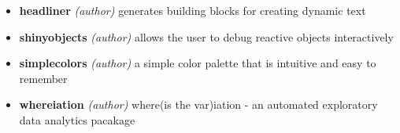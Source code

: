 \documentclass[11pt, a4paper]{awesome-cv}
\providecommand{\tightlist}{%
	\setlength{\itemsep}{0pt}\setlength{\parskip}{0pt}}
\begin{document}
\begin{itemize}
\tightlist
\item
  \textbf{headliner} \emph{(author)} generates building blocks for
  creating dynamic text
  \href{https://rjake.github.io/headliner/}{\tiny\color{lightgray}\faLink}
\item
  \textbf{shinyobjects} \emph{(author)} allows the user to debug
  reactive objects interactively
  \href{https://rjake.github.io/shinyobjects/index.html}{\tiny\color{lightgray}\faLink}
\item
  \textbf{simplecolors} \emph{(author)} a simple color palette that is
  intuitive and easy to remember
  \href{https://rjake.github.io/simplecolors/articles/intro.html}{\tiny\color{lightgray}\faLink}
\item
  \textbf{whereiation} \emph{(author)} where(is the var)iation - an
  automated exploratory data analytics pacakage
  \href{https://rjake.github.io/whereiation/}{\tiny\color{lightgray}\faLink}
\end{itemize}
\end{document}
